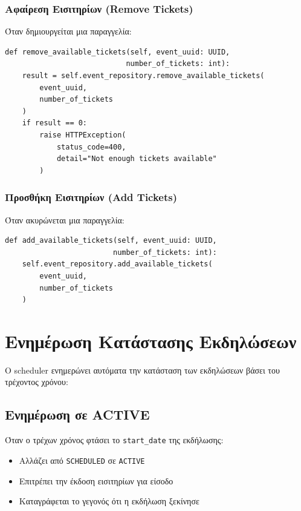 \documentclass[12pt,a4paper]{report}
\begin{document}
\subsubsection{Αφαίρεση Εισιτηρίων (Remove Tickets)}

Όταν δημιουργείται μια παραγγελία:
\begin{lstlisting}[caption=Remove Available Tickets]
def remove_available_tickets(self, event_uuid: UUID, 
                            number_of_tickets: int):
    result = self.event_repository.remove_available_tickets(
        event_uuid, 
        number_of_tickets
    )
    if result == 0:
        raise HTTPException(
            status_code=400, 
            detail="Not enough tickets available"
        )
\end{lstlisting}

\subsubsection{Προσθήκη Εισιτηρίων (Add Tickets)}

Όταν ακυρώνεται μια παραγγελία:
\begin{lstlisting}[caption=Add Available Tickets]
def add_available_tickets(self, event_uuid: UUID, 
                         number_of_tickets: int):
    self.event_repository.add_available_tickets(
        event_uuid, 
        number_of_tickets
    )
\end{lstlisting}

\section{Ενημέρωση Κατάστασης Εκδηλώσεων}

Ο scheduler ενημερώνει αυτόματα την κατάσταση των εκδηλώσεων βάσει του τρέχοντος χρόνου:

\subsection{Ενημέρωση σε ACTIVE}

Όταν ο τρέχων χρόνος φτάσει το \texttt{start\_date} της εκδήλωσης:
\begin{itemize}
    \item Αλλάζει από \texttt{SCHEDULED} σε \texttt{ACTIVE}
    \item Επιτρέπει την έκδοση εισιτηρίων για είσοδο
    \item Καταγράφεται το γεγονός ότι η εκδήλωση ξεκίνησε
\end{itemize}
\end{document}
